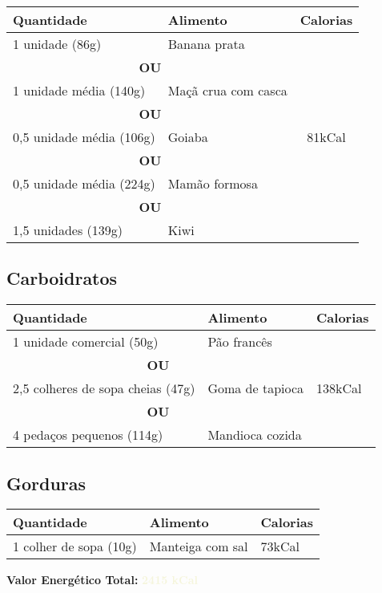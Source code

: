 \begin{tabular}{p{8cm}p{8cm}c}
\toprule
\textbf{Quantidade} & \textbf{Alimento} & \textbf{Calorias} \\
\midrule
1 unidade (86g) & Banana prata & \multirow{10}{*}{81kCal} \\
\cmidrule(lr){1-2}
\multicolumn{2}{c}{\textbf{OU}} \\
\cmidrule(lr){1-2}
1 unidade média (140g) & Maçã crua com casca & \\
\cmidrule(lr){1-2}
\multicolumn{2}{c}{\textbf{OU}} \\
\cmidrule(lr){1-2}
0,5 unidade média (106g) & Goiaba & \\
\cmidrule(lr){1-2}
\multicolumn{2}{c}{\textbf{OU}} \\
\cmidrule(lr){1-2}
0,5 unidade média (224g) & Mamão formosa & \\
\cmidrule(lr){1-2}
\multicolumn{2}{c}{\textbf{OU}} \\
\cmidrule(lr){1-2}
1,5 unidades (139g) & Kiwi & \\
\bottomrule
\end{tabular}

\subsection*{Carboidratos}

\begin{tabular}{p{8cm}p{8cm}m{1.5cm}}
\toprule
\textbf{Quantidade} & \textbf{Alimento} & \textbf{Calorias} \\
\midrule
1 unidade comercial (50g) & Pão francês & \multirow{6}{*}{138kCal} \\
\cmidrule(lr){1-2}
\multicolumn{2}{c}{\textbf{OU}} \\
\cmidrule(lr){1-2}
2,5 colheres de sopa cheias (47g) & Goma de tapioca \\
\cmidrule(lr){1-2}
\multicolumn{2}{c}{\textbf{OU}} \\
\cmidrule(lr){1-2}
4 pedaços pequenos (114g) & Mandioca cozida \\
\bottomrule
\end{tabular}

\subsection*{Gorduras}

\begin{tabular}{p{8cm}p{8cm}p{1.5cm}}
\toprule
\textbf{Quantidade} & \textbf{Alimento} & \textbf{Calorias} \\
\midrule
1 colher de sopa (10g) & Manteiga com sal & 73kCal \\
\bottomrule
\end{tabular}

\vspace{1cm}
\textbf{Valor Energético Total:} \textcolor{beige}{\Large{\textbf{2415 kCal}}}